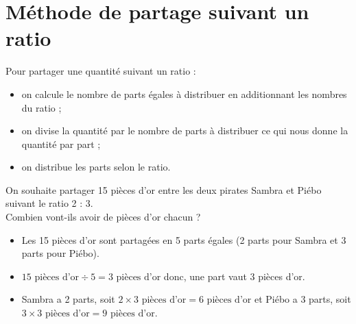 \section{Méthode de partage suivant un ratio}

\begin{methode}
Pour partager une quantité suivant un ratio :
   \begin{itemize}
      \item on calcule le nombre de parts égales à distribuer en additionnant les nombres du ratio ;
      \item on divise la quantité par le nombre de parts à distribuer ce qui nous donne la quantité par part ;
      \item on distribue les parts selon le ratio.
   \end{itemize}
   \exercice
   On souhaite partager 15 pièces d'or entre les deux pirates Sambra et Piébo suivant le ratio 2 : 3. \\
   Combien vont-ils avoir de pièces d'or chacun ?
   \correction
   \ \\ [-10mm]
   \begin{itemize}
      \item Les 15 pièces d'or sont partagées en 5 parts égales (2 parts pour Sambra et 3 parts pour Piébo).
      \item $15\text{ pièces d'or}\div 5 =3\text{ pièces d'or}$ donc, une part vaut 3 pièces d'or.
     \item Sambra a 2 parts, soit $2\times3\text{ pièces d'or} =6\text{ pièces d'or}$ et Piébo a 3 parts, soit $3\times3\text{ pièces d'or} =9\text{ pièces d'or}$. 
   \end{itemize}
\end{methode}

\medskip

\begin{center}
\end{center}


\exercicesbase

